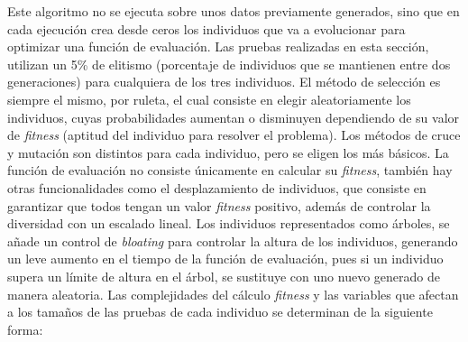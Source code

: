 	Este algoritmo no se ejecuta sobre unos datos previamente generados, sino que en cada ejecución crea desde ceros los individuos que va a evolucionar para optimizar una función de evaluación. Las pruebas realizadas en esta sección, utilizan un 5\% de elitismo (porcentaje de individuos que se mantienen entre dos generaciones) para cualquiera de los tres individuos. El método de selección es siempre el mismo, por ruleta, el cual consiste en elegir aleatoriamente los individuos, cuyas probabilidades aumentan o disminuyen dependiendo de su valor de \textit{fitness} (aptitud del individuo para resolver el problema). Los métodos de cruce y mutación son distintos para cada individuo, pero se eligen los más básicos. La función de evaluación no consiste únicamente en calcular su \textit{fitness}, también hay otras funcionalidades como el desplazamiento de individuos, que consiste en garantizar que todos tengan un valor \textit{fitness} positivo, además de controlar la diversidad con un escalado lineal. Los individuos representados como árboles, se añade un control de \textit{bloating} para controlar la altura de los individuos, generando un leve aumento en el tiempo de la función de evaluación, pues si un individuo supera un límite de altura en el árbol, se sustituye con uno nuevo generado de manera aleatoria. Las complejidades del cálculo \textit{fitness} y las variables que afectan a los tamaños de las pruebas de cada individuo se determinan de la siguiente forma:
